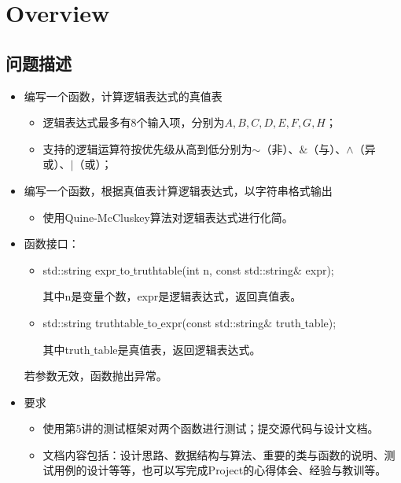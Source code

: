 
\section{Overview}

\subsection{问题描述}

\begin{itemize}

\item{\Large{编写一个函数，计算逻辑表达式的真值表}}
	\begin{itemize}
		\item	逻辑表达式最多有8个输入项，分别为$A,B,C,D,E,F,G,H$；

		\item	支持的逻辑运算符按优先级从高到低分别为$\sim$（非）、$\&$（与）、$\land$（异或）、$\mid$（或）；
	
	\end{itemize}
\item{\Large{编写一个函数，根据真值表计算逻辑表达式，以字符串格式输出}}
	\begin{itemize}
		\item	使用Quine-McCluskey算法对逻辑表达式进行化简。	
	\end{itemize}

\item{\Large{函数接口：}}
	\begin{itemize}
		\item	std::string expr$\_$to$\_$truthtable(int n, const std::string$\&$ expr);

其中n是变量个数，expr是逻辑表达式，返回真值表。

		\item	std::string truthtable$\_$to$\_$expr(const std::string$\&$ truth$\_$table);

其中truth$\_$table是真值表，返回逻辑表达式。
	
	\end{itemize}

若参数无效，函数抛出异常。

\item{\Large{要求}}
	\begin{itemize}
		\item	使用第5讲的测试框架对两个函数进行测试；提交源代码与设计文档。
		\item	文档内容包括：设计思路、数据结构与算法、重要的类与函数的说明、测试用例的设计等等，也可以写完成Project的心得体会、经验与教训等。
	
	\end{itemize}

\end{itemize}


